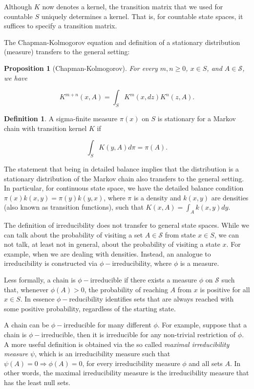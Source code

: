 \documentclass{book}
\theoremstyle{plain}%
\newtheorem{proposition}{Proposition}[section]
\theoremstyle{definition}
\newtheorem{definition}{Definition}[section]
\newlength{\arrow}
\begin{document}
Although $K$ now denotes a kernel, the transition matrix that we used for countable $S$ uniquely determines a kernel. That is, for countable state spaces, it suffices to specify a transition matrix.

The Chapman-Kolmogorov equation and definition of a stationary distribution (measure) transfers to the general setting:

\begin{proposition}[Chapman-Kolmogorov] For every $m, n \geq 0$, $x \in S$, and $A \in \mathcal{S}$, we have 

$$K^{m+n}(x, A) = \int_{S} K^m(x,dz)K^n(z,A).$$
\label{prop:chapman} 
\end{proposition}

\begin{definition} A sigma-finite measure $\pi(x)$ on $S$ is stationary for a Markov chain with transition kernel $K$ if

$$\int_{S} K(y,A)d\pi = \pi(A).$$
\end{definition}

The statement that being in detailed balance implies that the distribution is a stationary distribution of the Markov chain also transfers to the general setting. In particular, for continuous state space, we have the detailed balance condition $\pi(x)k(x, y) = \pi(y)k(y,x)$, where $\pi$ is a density and $k(x, y)$ are densities (also known as transition functions), such that $K(x, A) = \int_A k(x, y) dy$.

The definition of irreducibility does not transfer to general state spaces. While we can talk about the probability of visiting a set $A \in \mathcal{S}$ from state $x \in S$, we can not talk, at least not in general, about the probability of visiting a state $x$. For example, when we are dealing with densities. Instead, an analogue to irreducibility is constructed via $\phi-$irreducibility, where $\phi$ is a measure.

Less formally, a chain is $\phi-$irreducible if there exists a measure $\phi$ on $\mathcal{S}$ such that, whenever $\phi(A) > 0$, the probability of reaching $A$ from $x$ is positive for all $x \in S$. In essence $\phi-$reducibility identifies sets that are always reached with some positive probability, regardless of the starting state.

A chain can be $\phi-$irreducible for many different $\phi$. For example, suppose that a chain is $\phi-$irreducible, then it is irreducible for any non-trivial restriction of $\phi$. A more useful definition is obtained via the so called \emph{maximal irreducibility measure} $\psi$, which is an irreducibility measure such that $\psi(A) = 0 \Rightarrow \phi(A) = 0$, for every irreducibility measure $\phi$ and all sets $A$. In other words, the maximal irreducibility measure is the irreducibility measure that has the least null sets.
\end{document}
